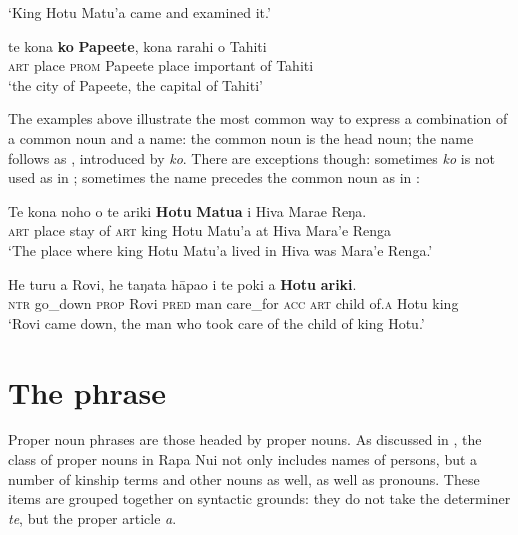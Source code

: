 \glt 
‘King Hotu Matu’a came and examined it.’ \textstyleExampleref{[Mtx-2-02.043]}
\z

\ea\label{ex:5.175}
\gll te kona \textbf{ko} \textbf{Pape{\ꞌ}ete}, kona rarahi o Tahiti \\
\textsc{art} place \textsc{prom} Papeete place important of Tahiti \\

\glt
‘the city of Papeete, the capital of Tahiti’ \textstyleExampleref{[R231.045]} 
\z

The examples above illustrate the most common way to express a combination of a common noun and a name: the common noun is the head noun; the name follows as , introduced by \textit{ko}. There are exceptions though: sometimes \textit{ko} is not used as in ; sometimes the name precedes the common noun as in : 

\ea\label{ex:5.176}
\gll Te kona noho o te {\ꞌ}ariki \textbf{Hotu} \textbf{Matu{\ꞌ}a} {\ꞌ}i Hiva Mara{\ꞌ}e Reŋa. \\
\textsc{art} place stay of \textsc{art} king Hotu Matu’a at Hiva Mara’e Renga \\

\glt 
‘The place where king Hotu Matu’a lived in Hiva was Mara’e Renga.’ \textstyleExampleref{[Ley-2-01.002]}
\z

\ea\label{ex:5.177}
\gll He turu a Rovi, he taŋata hāpa{\ꞌ}o i te poki {\ꞌ}a \textbf{Hotu} \textbf{{\ꞌ}ariki}. \\
\textsc{ntr} go\_down \textsc{prop} Rovi \textsc{pred} man care\_for \textsc{acc} \textsc{art} child of\textsc{.a} Hotu king \\

\glt 
‘Rovi came down, the man who took care of the child of king Hotu.’ \textstyleExampleref{[R422.002]} 
\z
{}
\section{The  phrase}\label{sec:5.13}
Proper noun phrases are those headed by proper nouns. As discussed in , the class of proper nouns in Rapa Nui not only includes names of persons, but a number of kinship terms and other nouns as well, as well as pronouns. These items are grouped together on syntactic grounds: they do not take the determiner \textit{te}, but the proper article \textit{a}. 

